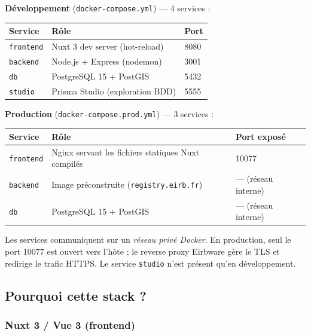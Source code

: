 \documentclass[11pt,a4paper]{article}
\begin{document}
\medskip
\noindent\textbf{Développement} (\texttt{docker-compose.yml}) — 4 services :

\begin{center}
\begin{tabular}{lll}
\toprule
\textbf{Service} & \textbf{Rôle} & \textbf{Port} \\
\midrule
\texttt{frontend} & Nuxt 3 dev server (hot-reload) & 8080 \\
\texttt{backend}  & Node.js + Express (nodemon)     & 3001 \\
\texttt{db}       & PostgreSQL 15 + PostGIS          & 5432 \\
\texttt{studio}   & Prisma Studio (exploration BDD)  & 5555 \\
\bottomrule
\end{tabular}
\end{center}

\noindent\textbf{Production} (\texttt{docker-compose.prod.yml}) — 3 services :

\begin{center}
\begin{tabular}{lll}
\toprule
\textbf{Service} & \textbf{Rôle} & \textbf{Port exposé} \\
\midrule
\texttt{frontend} & Nginx servant les fichiers statiques Nuxt compilés & 10077 \\
\texttt{backend}  & Image préconstruite (\texttt{registry.eirb.fr})     & — (réseau interne) \\
\texttt{db}       & PostgreSQL 15 + PostGIS                              & — (réseau interne) \\
\bottomrule
\end{tabular}
\end{center}

Les services communiquent sur un \textit{réseau privé Docker}. En production, seul le port 10077 est ouvert vers l'hôte ; le reverse proxy Eirbware gère le TLS et redirige le trafic HTTPS. Le service \texttt{studio} n'est présent qu'en développement.

\subsection{Pourquoi cette stack ?}

\subsubsection*{Nuxt 3 / Vue 3 (frontend)}
\end{document}
